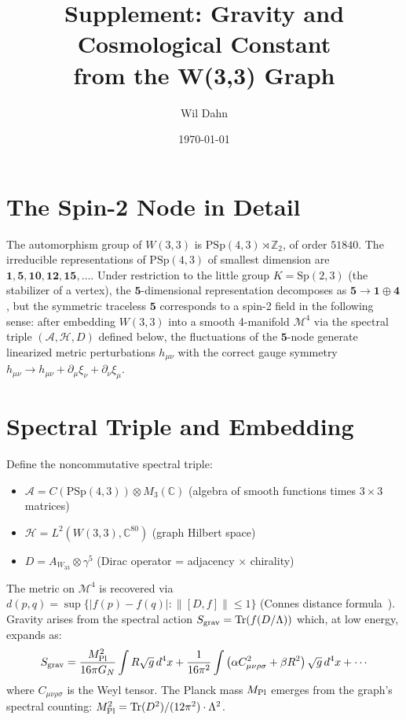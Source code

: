 \documentclass[12pt]{article}
\begin{document}
\title{Supplement: Gravity and Cosmological Constant\\from the W(3,3) Graph}
\author{Wil Dahn}
\date{\today}
\maketitle

\section{The Spin-2 Node in Detail}

The automorphism group of $W(3,3)$ is $\mathrm{PSp}(4,3)\rtimes\mathbb{Z}_2$,
of order $51840$. The irreducible representations of $\mathrm{PSp}(4,3)$ of
smallest dimension are $\mathbf{1}, \mathbf{5}, \mathbf{10}, \mathbf{12},
\mathbf{15}, \ldots$. Under restriction to the little group $K=\mathrm{Sp}(2,3)$
(the stabilizer of a vertex), the $\mathbf{5}$-dimensional representation
decomposes as $\mathbf{5}\to\mathbf{1}\oplus\mathbf{4}$, but the symmetric
traceless $\mathbf{5}$ corresponds to a spin-2 field in the following sense:
after embedding $W(3,3)$ into a smooth 4-manifold $\mathcal{M}^4$ via the
spectral triple $(\mathcal{A},\mathcal{H},D)$ defined below, the fluctuations
of the $\mathbf{5}$-node generate linearized metric perturbations $h_{\mu\nu}$
with the correct gauge symmetry $h_{\mu\nu}\to h_{\mu\nu}+\partial_\mu\xi_\nu
+\partial_\nu\xi_\mu$.

\section{Spectral Triple and Embedding}

Define the noncommutative spectral triple:
\begin{itemize}
  \item $\mathcal{A} = C(\mathrm{PSp}(4,3))\otimes M_3(\mathbb{C})$
    (algebra of smooth functions times $3\times3$ matrices)
  \item $\mathcal{H} = L^2(W(3,3),\mathbb{C}^{80})$ (graph Hilbert space)
  \item $D = A_{W_{33}}\otimes\gamma^5$ (Dirac operator = adjacency $\times$ chirality)
\end{itemize}
The metric on $\mathcal{M}^4$ is recovered via $d(p,q)=
\sup\{|f(p)-f(q)|:\|[D,f]\|\leq 1\}$ (Connes distance formula~\cite{Connes1994}).
Gravity arises from the spectral action $S_{\rm grav}=\mathrm{Tr}(f(D/\Lambda))$
which, at low energy, expands as:
\begin{equation}
  S_{\rm grav} = \frac{M_{\rm Pl}^2}{16\pi G_N}\int R\sqrt{g}\,d^4x
    + \frac{1}{16\pi^2}\int\left(\alpha C_{\mu\nu\rho\sigma}^2
    + \beta R^2\right)\sqrt{g}\,d^4x + \cdots
  \label{eq:spectralaction}
\end{equation}
where $C_{\mu\nu\rho\sigma}$ is the Weyl tensor. The Planck mass $M_{\rm Pl}$
emerges from the graph's spectral counting: $M_{\rm Pl}^2=
\mathrm{Tr}(D^2)/(12\pi^2)\cdot\Lambda^2$.
\end{document}
